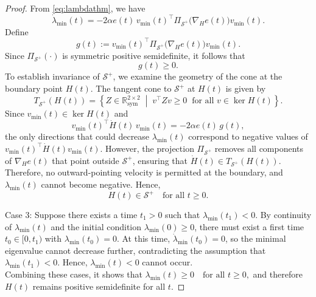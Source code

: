 \documentclass[10pt,a4paper]{amsart}
\begin{document}
\begin{proof}
From \eqref{eq:lambdathm}, we have
\[
\dot{\lambda}_{\min}(t)
= -2\alpha e(t)\,
v_{\min}(t)^\top
\Pi_{\mathcal S^+}\big(\nabla_H e(t)\big)
v_{\min}(t).
\]
Define
\[
g(t)
:= v_{\min}(t)^\top
\Pi_{\mathcal S^+}\big(\nabla_H e(t)\big)
v_{\min}(t).
\]
Since $\Pi_{\mathcal S^+}(\cdot)$ is symmetric positive semidefinite,
it follows that
\[
g(t) \ge 0.
\] To establish invariance of $\mathcal S^+$, we examine the geometry of the cone
at the boundary point $H(t)$. The tangent cone to $\mathcal S^+$ at $H(t)$ is
given by
\[
T_{\mathcal S^+}(H(t))
=
\left\{
Z \in \mathbb{R}^{2\times 2}_{\mathrm{sym}}
\;\middle|\;
v^\top Z v \ge 0
\;\; \text{for all } v \in \ker H(t)
\right\}.
\]
Since $v_{\min}(t)\in \ker H(t)$ and
\[
v_{\min}(t)^\top \dot H(t)\, v_{\min}(t)
=
-2\alpha e(t)\, g(t),
\]
the only directions that could decrease $\lambda_{\min}(t)$ correspond to
negative values of $v_{\min}(t)^\top \dot H(t) v_{\min}(t)$.
However, the projection $\Pi_{\mathcal S^+}$ removes all components of
$\nabla_H e(t)$ that point outside $\mathcal S^+$, ensuring that
$\dot H(t)\in T_{\mathcal S^+}(H(t))$.
Therefore, no outward-pointing velocity is permitted at the boundary, and
$\lambda_{\min}(t)$ cannot become negative. Hence,
\[
H(t) \in \mathcal S^+ \quad \text{for all } t \ge 0.
\]


Case 3:  Suppose there exists a time $t_1 > 0$ such that $\lambda_{\min}(t_1) < 0$. By continuity of $\lambda_{\min}(t)$ and the initial condition $\lambda_{\min}(0) \ge 0$, there must exist a first time $t_0 \in [0,t_1)$ with $\lambda_{\min}(t_0) = 0$. At this time, $\dot \lambda_{\min}(t_0) = 0$, so the minimal eigenvalue cannot decrease further, contradicting the assumption that $\lambda_{\min}(t_1) < 0$. Hence, $\lambda_{\min}(t) < 0$ cannot occur.\\

Combining these cases, it shows that $
\lambda_{\min}(t) \ge 0 \quad \text{for all } t \ge 0, $ and therefore $H(t)$ remains positive semidefinite for all $t$.

\end{proof}
\end{document}
